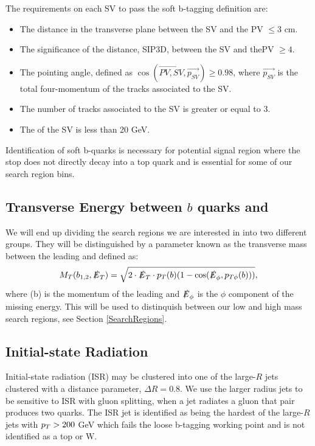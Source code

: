 The requirements on each SV to pass the soft b-tagging definition are:
\begin{itemize}
	 \item The distance in the transverse plane between the SV and the PV $\leq3$ cm.
	 \item The significance of the distance, SIP3D, between the SV and thePV $\geq4$.
	 \item The pointing angle, defined as $\cos(\overrightarrow{PV,SV},\overrightarrow{p_{SV}})\geq0.98$, where $\overrightarrow{p_{SV}}$ is the total four-momentum of the tracks associated to the SV. 
	 \item The number of tracks associated to the SV is greater or equal to 3.
	 \item The \pt{} of the SV is less than 20 GeV.
\end{itemize}
Identification of soft b-quarks is necessary for potential signal region where the stop does not directly decay into a top quark and is essential for some of our search region bins. 

\subsection{Transverse Energy between $b$ quarks and \met}
We will end up dividing the search regions we are interested in into two different groups. They will be distinguished by a parameter known as the transverse mass between the leading \bjet{} and \met{} defined as:
\begin{equation}\label{TransverseMass}
M_{T}(b_{1,2},\slashed{E}_{T})=\sqrt{2\cdot\slashed{E}_{T}\cdot p_{T}(b)(1-\cos(\slashed{E}_\phi,p_{T\phi}(b)))},
\end{equation}
where \pt(b) is the momentum of the leading \bjet{} and $\slashed{E}_\phi$ is the $\phi$ component of the missing energy. This will be used to distinquish between our low and high mass search regions, see Section \ref{SearchRegions}.


\subsection{Initial-state Radiation}\label{ISRpt}

Initial-state radiation (ISR) may be clustered into one of the large-$R$ jets clustered with a distance parameter, $\Delta R=0.8$. We use the larger radius jets to be sensitive to ISR with gluon splitting, when a jet radiates a gluon that pair produces two quarks. The ISR jet is identified as being the hardest of the large-$R$ jets with $p_{T}>200$ GeV which fails the loose b-tagging working point and is not identified as a top or W. 
 
